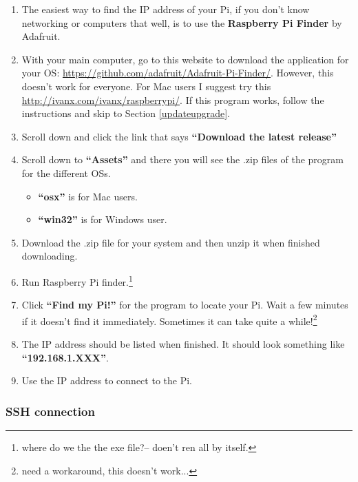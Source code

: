\documentclass{article}
\begin{document}
\begin{enumerate}
  \item The easiest way to find the IP address of your Pi, if you don't know networking or computers that well, is to use the \textbf{Raspberry Pi Finder} by Adafruit. 
  \item With your main computer, go to this website to download the application for your OS: \newline \url{https://github.com/adafruit/Adafruit-Pi-Finder/}. However, this doesn't work for everyone. For Mac users I suggest try this \newline \newline \url{http://ivanx.com/ivanx/raspberrypi/}. If this program works, follow the instructions and skip to Section \ref{updateupgrade}. 
  
  \item Scroll down and click the link that says \textbf{``Download the latest release''}
  \item Scroll down to \textbf{``Assets''} and there you will see the .zip files of the program for the different OSs.
  \begin{itemize}
    \item \textbf{``osx''} is for Mac users.
    \item \textbf{``win32''} is for Windows user.
  \end{itemize}
  \item Download the .zip file for your system and then unzip it when finished downloading.
  \item Run Raspberry Pi finder.\footnote{where do we the the exe file?-- doen't ren all by itself.}
  \item Click \textbf{``Find my Pi!''} for the program to locate your Pi. Wait a few minutes if it doesn't find it immediately. Sometimes it can take quite a while!\footnote{need a workaround, this doesn't work...}
  \item The IP address should be listed when finished. It should look something like \textbf{``192.168.1.XXX''}. \label{ipaddress}
  \item Use the IP address to connect to the Pi.
\end{enumerate}

\subsubsection{SSH connection}
\label{ssh}
\end{document}
